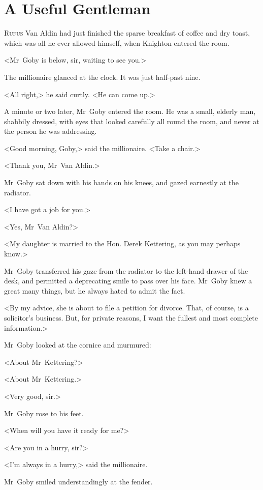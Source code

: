 \chapter{A Useful Gentleman}



\lettrine{R}{ufus} Van Aldin had just finished the sparse breakfast of coffee and dry toast, which was all he ever allowed himself, when Knighton entered the room.

\zz
<Mr~Goby is below, sir, waiting to see you.>

\zz
The millionaire glanced at the clock. It was just half-past nine.

<All right,> he said curtly. <He can come up.>

A minute or two later, Mr~Goby entered the room. He was a small, elderly man, shabbily dressed, with eyes that looked carefully all round the room, and never at the person he was addressing.

<Good morning, Goby,> said the millionaire. <Take a chair.>

<Thank you, Mr~Van Aldin.>

Mr~Goby sat down with his hands on his knees, and gazed earnestly at the radiator.

<I have got a job for you.>

<Yes, Mr~Van Aldin?>

<My daughter is married to the Hon. Derek Kettering, as you may perhaps know.>

Mr~Goby transferred his gaze from the radiator to the left-hand drawer of the desk, and permitted a deprecating smile to pass over his face. Mr~Goby knew a great many things, but he always hated to admit the fact.

<By my advice, she is about to file a petition for divorce. That, of course, is a solicitor's business. But, for private reasons, I want the fullest and most complete information.>

Mr~Goby looked at the cornice and murmured:

<About Mr~Kettering?>

<About Mr~Kettering.>

<Very good, sir.>

Mr~Goby rose to his feet.

<When will you have it ready for me?>

<Are you in a hurry, sir?>

<I'm always in a hurry,> said the millionaire.

Mr~Goby smiled understandingly at the fender.

